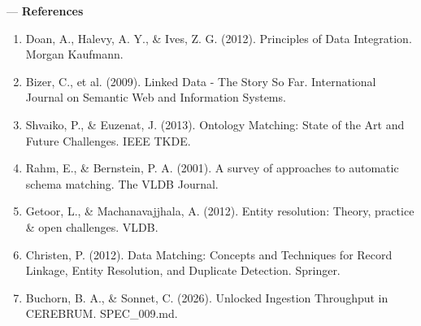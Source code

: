 ---
\textbf{References}
\begin{enumerate}
\item Doan, A., Halevy, A. Y., \& Ives, Z. G. (2012). Principles of Data Integration. Morgan Kaufmann.
\item Bizer, C., et al. (2009). Linked Data - The Story So Far. Intern\-ational Journal on Semantic Web and Information Systems.
\item Shvaiko, P., \& Euzenat, J. (2013). Ontology Matching: State of the Art and Future Challenges. IEEE TKDE.
\item Rahm, E., \& Bernstein, P. A. (2001). A survey of approaches to automatic schema matching. The VLDB Journal.
\item Getoor, L., \& Machan\-avajjhala, A. (2012). Entity resolution: Theory, practice \& open challenges. VLDB.
\item Christen, P. (2012). Data Matching: Concepts and Techniques for Record Linkage, Entity Resolution, and Duplicate Detection. Springer.
\item Buchorn, B. A., \& Sonnet, C. (2026). Unlocked Ingestion Throughput in CEREBRUM. SPEC\_009.md.

\end{enumerate}
